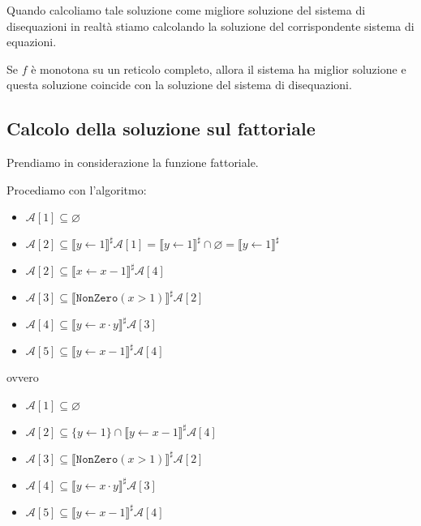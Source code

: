 Quando calcoliamo tale soluzione come migliore soluzione del sistema di disequazioni in realtà stiamo
calcolando la soluzione del corrispondente sistema di equazioni.
\begin{tcolorbox}
    Se $f$ è monotona su un reticolo completo, allora il sistema ha miglior soluzione e questa soluzione 
    coincide con la soluzione del sistema di disequazioni.
\end{tcolorbox}
\subsection{Calcolo della soluzione sul fattoriale}
Prendiamo in considerazione la funzione fattoriale.
\begin{figure}[H]
    \centering
\end{figure}
Procediamo con l'algoritmo:
\begin{itemize}
    \item $\mathcal{A}[1] \subseteq \varnothing$
    \item $\mathcal{A}[2] \subseteq \llbracket y \gets 1\rrbracket^\sharp\mathcal{A}[1] = \llbracket y \gets 1\rrbracket^\sharp \cap 
    \varnothing = \llbracket y \gets 1\rrbracket^\sharp$
    \item $\mathcal{A}[2] \subseteq \llbracket x \gets x - 1\rrbracket^\sharp\mathcal{A}[4]$
    \item $\mathcal{A}[3] \subseteq \llbracket \texttt{NonZero}(x > 1)\rrbracket^\sharp\mathcal{A}[2]$
    \item $\mathcal{A}[4] \subseteq \llbracket y \gets x \cdot y\rrbracket^\sharp\mathcal{A}[3]$
    \item $\mathcal{A}[5] \subseteq \llbracket y \gets x - 1\rrbracket^\sharp\mathcal{A}[4]$
\end{itemize}
ovvero
\begin{itemize}
    \item $\mathcal{A}[1] \subseteq \varnothing$
    \item $\mathcal{A}[2] \subseteq \{y \gets 1\} \cap \llbracket y \gets x - 1\rrbracket^\sharp\mathcal{A}[4]$
    \item $\mathcal{A}[3] \subseteq \llbracket \texttt{NonZero}(x > 1)\rrbracket^\sharp\mathcal{A}[2]$
    \item $\mathcal{A}[4] \subseteq \llbracket y \gets x \cdot y\rrbracket^\sharp\mathcal{A}[3]$
    \item $\mathcal{A}[5] \subseteq \llbracket y \gets x - 1\rrbracket^\sharp\mathcal{A}[4]$
\end{itemize}

